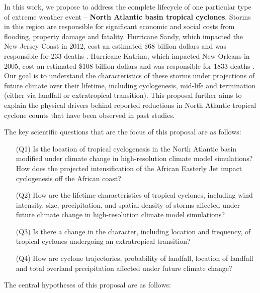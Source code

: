 \documentclass[11pt]{article}
\begin{document}
In this work, we propose to address the complete lifecycle of one particular type of extreme weather event -- \textbf{North Atlantic basin tropical cyclones}.  Storms in this region are responsible for significant economic and social costs from flooding, property damage and fatality.  Hurricane Sandy, which impacted the New Jersey Coast in 2012, cost an estimated \$68 billion dollars and was responsible for 233 deaths \citep{Blake2012Report}.  Hurricane Katrina, which impacted New Orleans in 2005, cost an estimated \$108 billion dollars and was responsible for 1833 deaths \citep{Knabb2005Report}.  Our goal is to understand the characteristics of these storms under projections of future climate over their lifetime, including cyclogenesis, mid-life and termination (either via landfall or extratropical transition).  This proposal  further aims to explain the physical drivers behind reported reductions in North Atlantic tropical cyclone counts that have been observed in past studies.

The key scientific questions that are the focus of this proposal are as follows:
\begin{itemize}
\item[(Q1)] Is the location of tropical cyclogenesis in the North Atlantic basin modified under climate change in high-resolution climate model simulations? How does the projected intensification of the African Easterly Jet impact cyclogenesis off the African coast?

\item[(Q2)] How are the lifetime characteristics of tropical cyclones, including wind intensity, size, precipitation, and spatial density of storms affected under future climate change in high-resolution climate model simulations?

\item[(Q3)] Is there a change in the character, including location and frequency, of tropical cyclones undergoing an extratropical transition?

\item[(Q4)] How are cyclone trajectories, probability of landfall, location of landfall and total overland precipitation affected under future climate change? 
\end{itemize}

The central hypotheses of this proposal are as follows:
\end{document}
